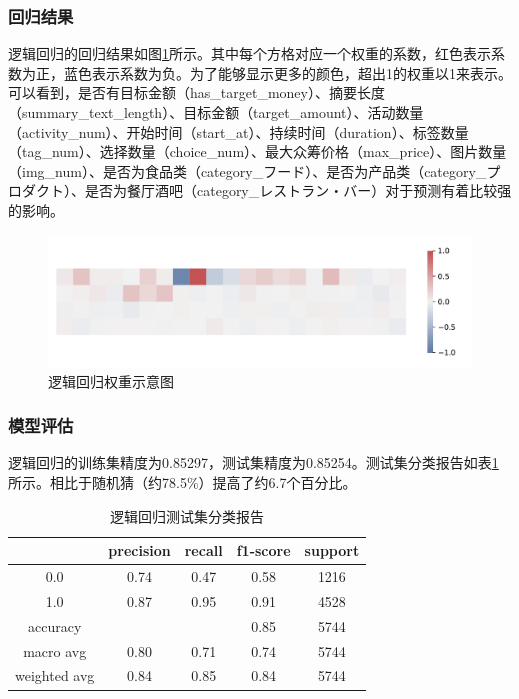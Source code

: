 \documentclass[lang=cn,a4paper]{elegantpaper}
\begin{document}
\subsubsection{回归结果}
逻辑回归的回归结果如图\ref{fig:lg1}所示。其中每个方格对应一个权重的系数，红色表示系数为正，蓝色表示系数为负。为了能够显示更多的颜色，超出1的权重以1来表示。可以看到，是否有目标金额（has\_target\_money）、摘要长度（summary\_text\_length）、目标金额（target\_amount）、活动数量（activity\_num）、开始时间（start\_at）、持续时间（duration）、标签数量（tag\_num）、选择数量（choice\_num）、最大众筹价格（max\_price）、图片数量（img\_num）、是否为食品类（category\_フード）、是否为产品类（category\_プロダクト）、是否为餐厅酒吧（category\_レストラン・バー）对于预测有着比较强的影响。
\begin{figure}[!h]
  \centering
  \includegraphics[width=\linewidth]{image/rg.pdf}
  \caption{逻辑回归权重示意图}
  \label{fig:lg1}
\end{figure}
\subsubsection{模型评估}

逻辑回归的训练集精度为0.85297，测试集精度为0.85254。测试集分类报告如表\ref{tbl:lg1}所示。相比于随机猜（约78.5\%）提高了约6.7个百分比。
\begin{table}[!htbp]
  \centering
  \caption{逻辑回归测试集分类报告}
  \begin{tabular}{ccccc}
    \toprule
    &precision&recall&f1-score&support\\
    \midrule
    0.0& 0.74&0.47&0.58&1216\\
    1.0& 0.87&0.95&0.91&4528\\
    accuracy&&&0.85&5744\\
   macro avg& 0.80&0.71&0.74&5744\\
weighted avg& 0.84&0.85&0.84&5744\\
    \bottomrule
  \end{tabular}
  \label{tbl:lg1}
\end{table}
\end{document}
